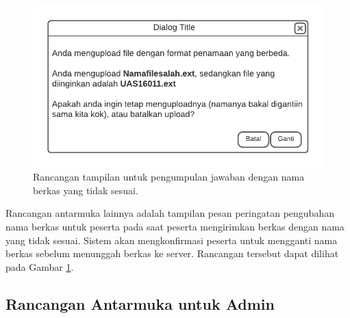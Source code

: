     \begin{figure}
        \centering
        \includegraphics{Gambar/mockups/Mockup--Peserta - Mismatch Filename.pdf}
        \caption{Rancangan tampilan untuk pengumpulan jawaban dengan nama berkas yang tidak sesuai.}
        \label{fig:mockup_peserta_mismatch}
    \end{figure}
    Rancangan antarmuka lainnya adalah tampilan pesan peringatan pengubahan nama
    berkas untuk peserta pada saat peserta mengirimkan berkas dengan nama yang
    tidak sesuai. Sistem akan mengkonfirmasi peserta untuk mengganti nama berkas
    sebelum menunggah berkas ke server. Rancangan tersebut dapat dilihat pada
    Gambar \ref{fig:mockup_peserta_mismatch}.
    
\subsection{Rancangan Antarmuka untuk Admin}
    
